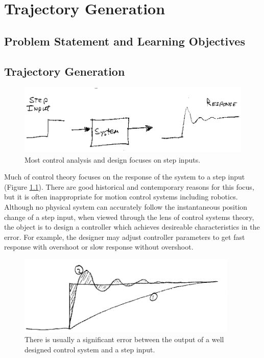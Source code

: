 %

\chapter{Trajectory Generation}\label{ChapterTrajectoryGeneration}

\section{Problem Statement and Learning Objectives}



\section{Trajectory Generation}

\begin{figure}\centering
\includegraphics[width=12.5cm]{figs07/00520.eps}
\caption{Most control analysis and design focuses on step inputs.}\label{stepinputdesign}
\end{figure}



Much of control theory focuses on the response of the system to a step input (Figure \ref{stepinputdesign}).  There are good historical and contemporary reasons for this focus, but it is often inappropriate for motion control systems including robotics.  Although no physical system can accurately follow the instantaneous position change of a step input, when viewed through the lens of control systems theory, the object is to design a controller which achieves desireable characteristics in the error.  For example, the designer may adjust controller parameters to get fast response with overshoot or slow response without overshoot.

\begin{figure}\centering
\includegraphics[width=10.5cm]{figs07/00521.eps}
\caption{There is usually a significant error between the output of a well designed control system and a step input.}\label{stepresponseerror}
\end{figure}


